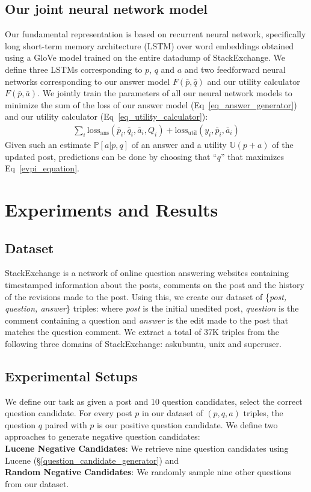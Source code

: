 \documentclass[11pt,a4paper]{article}
\newcommand{\U}{\mathbb{U}}
\begin{document}
\subsection{Our joint neural network model}\label{neural_network}
Our fundamental representation is based on recurrent neural network, specifically long short-term memory architecture (LSTM) \cite{hochreiter1997long} over word embeddings obtained using a GloVe \cite{pennington2014glove} model trained on the entire datadump of StackExchange. We define three LSTMs corresponding to $p$, $q$ and $a$ and two feedforward neural networks corresponding to our answer model $F(\bar{p},\bar{q})$ and our utility calculator $F(\bar{p}, \bar{a})$. We jointly train the parameters of all our neural network models to minimize the sum of the loss of our answer model (Eq~\ref{eq_answer_generator}) and our utility calculator (Eq~\ref{eq_utility_calculator}):
%
\begin{align}
\sum_i \textrm{loss}_{\textrm{ans}}(\bar p_i, \bar q_i, \bar a_i, Q_i)  
+  \textrm{loss}_{\textrm{util}}(y_i, \bar p_i, \bar a_i)
\end{align}
%
Given such an estimate $\mathbb{P}[a|p,q]$ of an answer and a utility $\U(p+a)$ of the updated post, predictions can be done by choosing that ``$q$'' that maximizes Eq~\ref{evpi_equation}. 

\section{Experiments and Results}

\subsection{Dataset}\label{dataset_creation}
StackExchange is a network of online question answering websites containing timestamped information about the posts, comments on the post and the history of the revisions made to the post. Using this, we create our dataset of \{\textit{post, question, answer}\} triples: where \textit{post} is the initial unedited post, \textit{question} is the comment containing a question and \textit{answer} is the edit made to the post that matches the question comment. We extract a total of 37K triples from the following three domains of StackExchange: askubuntu, unix and superuser.

\subsection{Experimental Setups}\label{task_setup}
We define our task as given a post and 10 question candidates, select the correct question candidate. For every post $p$ in our dataset of $(p, q, a)$ triples, the question $q$ paired with $p$ is our positive question candidate. We define two approaches to generate negative question candidates: \\
\textbf{Lucene Negative Candidates}: We retrieve nine question candidates using Lucene (\S\ref{question_candidate_generator}) and \\
\textbf{Random Negative Candidates}: We randomly sample nine other questions from our dataset.
\end{document}
